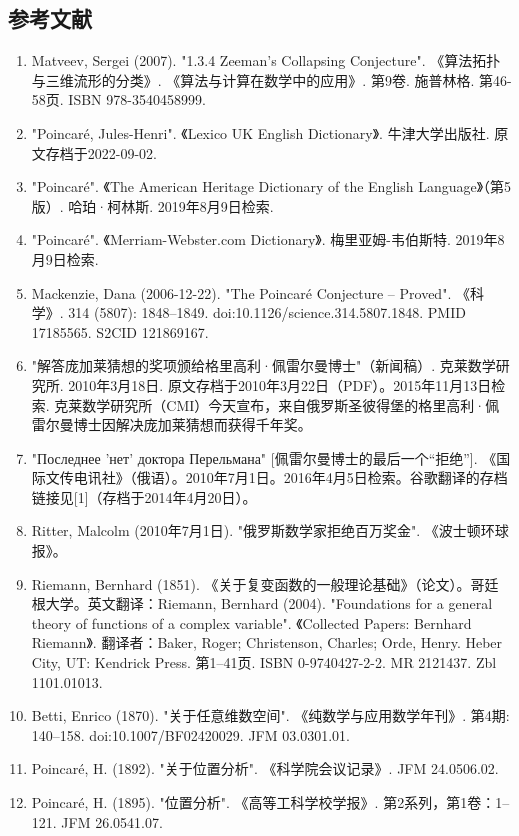 \subsection{参考文献}
\begin{enumerate}
\item Matveev, Sergei (2007). "1.3.4 Zeeman's Collapsing Conjecture". 《算法拓扑与三维流形的分类》. 《算法与计算在数学中的应用》. 第9卷. 施普林格. 第46-58页. ISBN 978-3540458999.  
\item "Poincaré, Jules-Henri". 《Lexico UK English Dictionary》. 牛津大学出版社. 原文存档于2022-09-02.  
\item "Poincaré". 《The American Heritage Dictionary of the English Language》（第5版）. 哈珀·柯林斯. 2019年8月9日检索.  
\item "Poincaré". 《Merriam-Webster.com Dictionary》. 梅里亚姆-韦伯斯特. 2019年8月9日检索.  
\item Mackenzie, Dana (2006-12-22). "The Poincaré Conjecture – Proved". 《科学》. 314 (5807): 1848–1849. doi:10.1126/science.314.5807.1848. PMID 17185565. S2CID 121869167.  
\item "解答庞加莱猜想的奖项颁给格里高利·佩雷尔曼博士"（新闻稿）. 克莱数学研究所. 2010年3月18日. 原文存档于2010年3月22日（PDF）。2015年11月13日检索. 克莱数学研究所（CMI）今天宣布，来自俄罗斯圣彼得堡的格里高利·佩雷尔曼博士因解决庞加莱猜想而获得千年奖。
\item "Последнее 'нет' доктора Перельмана" [佩雷尔曼博士的最后一个“拒绝”]. 《国际文传电讯社》（俄语）。2010年7月1日。2016年4月5日检索。谷歌翻译的存档链接见[1]（存档于2014年4月20日）。  
\item Ritter, Malcolm (2010年7月1日). "俄罗斯数学家拒绝百万奖金". 《波士顿环球报》。  
\item Riemann, Bernhard (1851). 《关于复变函数的一般理论基础》（论文）。哥廷根大学。英文翻译：Riemann, Bernhard (2004). "Foundations for a general theory of functions of a complex variable". 《Collected Papers: Bernhard Riemann》. 翻译者：Baker, Roger; Christenson, Charles; Orde, Henry. Heber City, UT: Kendrick Press. 第1–41页. ISBN 0-9740427-2-2. MR 2121437. Zbl 1101.01013.  
\item Betti, Enrico (1870). "关于任意维数空间". 《纯数学与应用数学年刊》. 第4期: 140–158. doi:10.1007/BF02420029. JFM 03.0301.01.  
\item Poincaré, H. (1892). "关于位置分析". 《科学院会议记录》. JFM 24.0506.02.  
\item Poincaré, H. (1895). "位置分析". 《高等工科学校学报》. 第2系列，第1卷：1–121. JFM 26.0541.07.

\end{enumerate}
